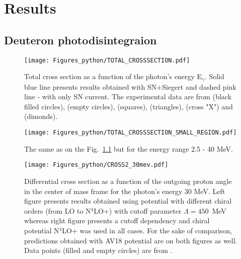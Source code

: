 \chapter{Results}

\section{Deuteron photodisintegraion}




    
    \begin{figure}[h]
        \begin{center}
        \texttt{[image: Figures\_python/TOTAL\_CROSSSECTION.pdf]}
        \end{center}
        \caption{Total cross section as a function of the photon's energy E$_\gamma$.
        Solid blue line presents results obtained with SN+Siegert 
        and dashed pink line - with only SN current.
        The experimental data are from \cite{Bernabei1986} (black filled circles),
        \cite{BOSMAN1979} (empty circles),
        \cite{ARENDS1984} (squares),
        \cite{Skopik1974} (triangles),
        \cite{Moreh1989} (cross "X") and
        \cite{Birenbaum1985} (dimonds).
        }
        \label{TOTAL_CROSS}
    \end{figure}
    

    \begin{figure}[h]
        \begin{center}
        \texttt{[image: Figures\_python/TOTAL\_CROSSSECTION\_SMALL\_REGION.pdf]}
        \end{center}
        \caption{The same as on the Fig.~\ref{TOTAL_CROSS} but for the energy range 2.5 - 40 MeV.
        }
        \label{TOTAL_CROSS_small}
    \end{figure}
        

    \begin{figure}[h]
        \begin{center}
        \texttt{[image: Figures\_python/CROSS2\_30mev.pdf]}
        \end{center}
        \caption{Differential cross section as a function of the outgoing proton angle in the center of mass frame 
        for the photon's energy 30 MeV. Left figure presents results obtained using potential
        with different chiral orders (from LO to N$^4$LO+) with cutoff parameter $\Lambda=450$~MeV
        whereas right figure presents a cutoff dependency and chiral potential N$^4$LO+ was used in all cases.
        For the sake of comparison, predictions obtained with AV18 potential are on both figures as well.
        Data points (filled and empty circles) are from \cite{Ying_Experiment_Deut}.}
        \label{CROSS_30}
    \end{figure}
        

